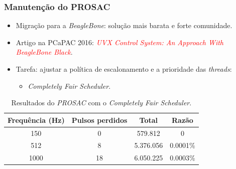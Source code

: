 \begin{frame}
\frametitle {Manutenção do PROSAC}

\begin{itemize}
  \item Migração para a \textit{BeagleBone}: solução mais barata e forte
  comunidade.
  \item Artigo na PCaPAC 2016: \textcolor{red}{\textit{UVX Control System: An
  Approach With BeagleBone Black}}.
  \item Tarefa: ajustar a política de escalonamento e a prioridade das
  \textit{threads}:
  \begin{itemize}
   \item \textit{Completely Fair Scheduler}.
   \end{itemize}
\end{itemize}

\vspace{-12pt}
\begin{table}[h]

	\centering
	\caption{\label{tab:prosac} Resultados do \textit{PROSAC} com o
	\textit{Completely Fair Scheduler}.}
	\begin{tabular}{| c | c | c | c |}
		\hline
		\textbf{Frequência (Hz)} & \textbf{Pulsos perdidos} & \textbf{Total} &
		\textbf{Razão} \\ \hline 
		150 & 0 & 579.812  & 0 \\ \hline
		512 & 8 & 5.376.056 & 0.0001\% \\ \hline
		1000 & 18 & 6.050.225 & 0.0003\% \\ \hline
	\end{tabular}	    
\end{table}

\end{frame}


